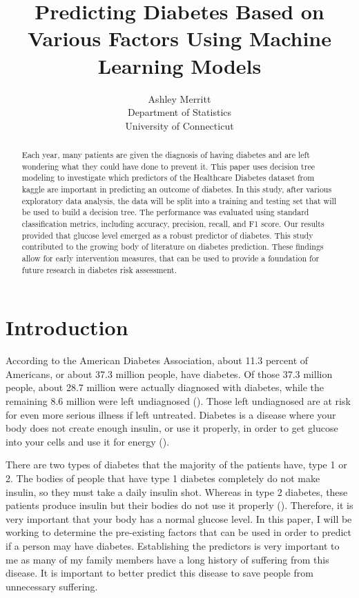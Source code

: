 \documentclass[12pt]{article}
\title{Predicting Diabetes Based on Various Factors Using Machine Learning Models}
\author{Ashley Merritt\\
    Department of Statistics\\
    University of Connecticut
    }
\begin{document}
\maketitle

\begin{abstract}
Each year, many patients are given the diagnosis of having diabetes and are left wondering what they could have done to prevent it. This
paper uses decision tree modeling to investigate which predictors of the Healthcare Diabetes dataset from kaggle are important in predicting 
an outcome of diabetes. In this study, after various exploratory data analysis, the data will be split into a training and testing set
that will be used to build a decision tree. The performance was evaluated using standard classification metrics, including accuracy, precision, 
recall, and F1 score. Our results provided that glucose level emerged as a robust predictor of diabetes. This study contributed to the growing body of
literature on diabetes prediction. These findings allow for early intervention measures, that can be used to provide a foundation for future research in diabetes
risk assessment.
\end{abstract}

\section{Introduction}
\label{sec:intro}
    According to the American Diabetes Association, about 11.3 percent of Americans, or about 37.3 million people, have diabetes.
    Of those 37.3 million people, about 28.7 million were actually diagnosed with diabetes, while the remaining 8.6 million were
    left undiagnosed (\citet{CDC2022Diabetes}). Those left undiagnosed are at risk for even more serious illness if left untreated. 
    Diabetes is a disease where your body does not create enough insulin, or use it properly, in order to get glucose into your cells 
    and use it for energy (\cite{NIH2023Whatis}).
    
    There are two types of diabetes that the majority of the patients have, type 1 or 2. The bodies of people that have type 1 diabetes
    completely do not make insulin, so they must take a daily insulin shot. Whereas in type 2 diabetes, these patients produce insulin but 
    their bodies do not use it properly (\cite{JDC2023Difference}). Therefore, it is very important that your body has a normal glucose level.
    In this paper, I will be working to determine the pre-existing factors that can be used in order to predict if a person may have diabetes. 
    Establishing the predictors is very important to me as many of my family members have a long history of suffering from this disease. 
    It is important to better predict this disease to save people from unnecessary suffering. 
\end{document}
